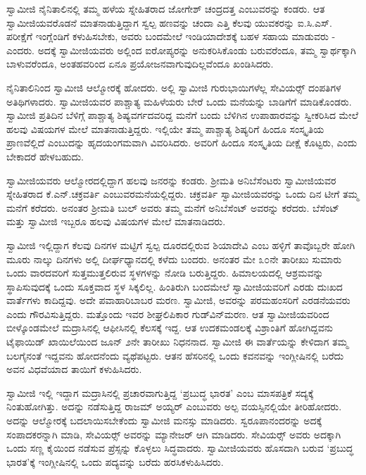 \vskip 2pt

 ಸ್ವಾಮೀಜಿ ನೈನಿತಾಲಿನಲ್ಲಿ ತಮ್ಮ ಹಳೆಯ ಸ್ನೇಹಿತರಾದ ಜೋಗೇಶ್ ಚಂದ್ರದತ್ತ ಎಂಬುವರನ್ನು ಕಂಡರು. ಆತ ಸ್ವಾಮೀಜಿಯವರೊಡನೆ ಮಾತನಾಡುತ್ತಿದ್ದಾಗ ಸ್ವಲ್ಪ ಹಣವನ್ನು ಚಂದಾ ಎತ್ತಿ ಕೆಲವು ಯುವಕರನ್ನು ಐ.ಸಿ.ಎಸ್. ಪರೀಕ್ಷೆಗೆ ಇಂಗ್ಲೆಂಡಿಗೆ ಕಳುಹಿಸಬೇಕು, ಅವರು ಬಂದಮೇಲೆ ಇಂಡಿಯಾದೇಶಕ್ಕೆ ಬಹಳ ಸಹಾಯ ಮಾಡುವರು - ಎಂದರು. ಅದಕ್ಕೆ ಸ್ವಾಮೀಜಿಯವರು ಅಲ್ಲಿಂದ ಐರೋಪ್ಯರನ್ನು ಅನುಕರಿಸಿಕೊಂಡು ಬರುವರೆಂದೂ, ತಮ್ಮ ಸ್ವಾರ್ಥಕ್ಕಾಗಿ ಬಾಳುವರೆಂದೂ, ಅಂತಹವರಿಂದ ಏನೂ ಪ್ರಯೋಜನವಾಗುವುದಿಲ್ಲವೆಂದೂ ಖಂಡಿಸಿದರು. 

 ನೈನಿತಾಲಿನಿಂದ ಸ್ವಾಮೀಜಿ ಆಲ್ಮೋರಕ್ಕೆ ಹೋದರು. ಅಲ್ಲಿ ಸ್ವಾಮೀಜಿ ಗುರುಭಾಯಿಗಳೆಲ್ಲ ಸೇವಿಯರ್ಸ್‍‍ ದಂಪತಿಗಳ ಅತಿಥಿಗಳಾದರು. ಸ್ವಾಮೀಜಿಯವರ ಪಾಶ್ಚಾತ್ಯ ಮಹಿಳೆಯರು ಬೇರೆ ಒಂದು ಮನೆಯನ್ನು ಬಾಡಿಗೆಗೆ ಮಾಡಿಕೊಂಡರು. ಸ್ವಾಮೀಜಿ ಪ್ರತಿದಿನ ಬೆಳಿಗ್ಗೆ ಪಾಶ್ಚಾತ್ಯ ಶಿಷ್ಯವರ್ಗದವರಿದ್ದ ಮನೆಗೆ ಬಂದು ಬೆಳಿಗಿನ ಉಪಾಹಾರವನ್ನು ಸ್ವೀಕರಿಸಿದ ಮೇಲೆ ಹಲವು ವಿಷಯಗಳ ಮೇಲೆ ಮಾತನಾಡುತ್ತಿದ್ದರು. ಇಲ್ಲಿಯೇ ತಮ್ಮ ಪಾಶ್ಚಾತ್ಯ ಶಿಷ್ಯರಿಗೆ ಹಿಂದೂ ಸಂಸ್ಕೃತಿಯ ಪ್ರಾಣವೆಲ್ಲಿದೆ ಎಂಬುದನ್ನು ಹೃದಯಂಗಮವಾಗಿ ವಿವರಿಸಿದರು. ಅವರಿಗೆ ಹಿಂದೂ ಸಂಸ್ಕೃತಿಯ ದೀಕ್ಷೆ ಕೊಟ್ಟರು, ಎಂದು ಬೇಕಾದರೆ ಹೇಳಬಹುದು. 

 ಸ್ವಾಮೀಜಿಯವರು ಆಲ್ಮೋರದಲ್ಲಿದ್ದಾಗ ಹಲವು ಜನರನ್ನು ಕಂಡರು. ಶ‍್ರೀಮತಿ ಅನಿಬೆಸೆಂಟರು ಸ್ವಾಮೀಜಿಯವರ ಸ್ನೇಹಿತರಾದ ಕೆ.ಎನ್.ಚಕ್ರವರ್ತಿ ಎಂಬುವರ\break ಮನೆಯಲ್ಲಿದ್ದರು. ಚಕ್ರವರ್ತಿ ಸ್ವಾಮೀಜಿಯವರನ್ನು ಒಂದು ದಿನ ಟೀಗೆ ತಮ್ಮ ಮನೆಗೆ ಕರೆದರು. ಅನಂತರ ಶ‍್ರೀಮತಿ ಬುಲ್ ಅವರು ತಮ್ಮ ಮನೆಗೆ ಅನಿಬೆಸೆಂಟ್ ಅವರನ್ನು ಕರೆದರು. ಬೆಸೆಂಟ್ ಮತ್ತು ಸ್ವಾಮೀಜಿ ಇಬ್ಬರೂ ಹಲವು ವಿಷಯಗಳ ಮೇಲೆ ಮಾತನಾಡಿದರು. 

 ಸ್ವಾಮೀಜಿ ಇಲ್ಲಿದ್ದಾಗ ಕೆಲವು ದಿನಗಳ ಮಟ್ಟಿಗೆ ಸ್ವಲ್ಪ ದೂರದಲ್ಲಿರುವ ಶಿಯಾದೇವಿ ಎಂಬ ಹಳ್ಳಿಗೆ ತಾವೊಬ್ಬರೇ ಹೋಗಿ ಮೂರು ನಾಲ್ಕು ದಿನಗಳು ಅಲ್ಲಿ ದೀರ್ಘಧ್ಯಾನದಲ್ಲಿ ಕಳೆದು ಬಂದರು. ಅನಂತರ ಮೇ ೩೦ನೇ ತಾರೀಖು ಸುಮಾರು ಒಂದು ವಾರದವರಿಗೆ ಸುತ್ತಮುತ್ತಲಿರುವ ಸ್ಥಳಗಳನ್ನು ನೋಡಿ ಬರುತ್ತಿದ್ದರು. ಹಿಮಾಲಯದಲ್ಲಿ ಆಶ್ರಮವನ್ನು ಸ್ಥಾಪಿಸುವುದಕ್ಕೆ ಒಂದು ಸೂಕ್ತವಾದ ಸ್ಥಳ ಸಿಕ್ಕಲಿಲ್ಲ. ಹಿಂತಿರುಗಿ ಬಂದಮೇಲೆ ಸ್ವಾಮೀಜಿಯವರಿಗೆ ಎರಡು ದುಃಖದ ವಾರ್ತೆಗಳು ಕಾದಿದ್ದವು. ಅದೇ ಪವಾಹಾರಿಬಾಬರ ಮರಣ. ಸ್ವಾಮೀಜಿ, ಅವರನ್ನು ಪರಮಹಂಸರಿಗೆ ಎರಡನೆಯವರು ಎಂದು ಗೌರವಿಸುತ್ತಿದ್ದರು. ಮತ್ತೊಂದು ಇವರ ಶೀಘ್ರಲಿಪಿಕಾರ ಗುಡ್‍ವಿನ್​ಮರಣ. ಆತ ಸ್ವಾಮೀಜಿಯವರಿಂದ ಬೀಳ್ಕೊಂಡಮೇಲೆ ಮದ್ರಾಸಿನಲ್ಲಿ  ಆಫೀಸಿನಲ್ಲಿ ಕೆಲಸಕ್ಕೆ ಇದ್ದ. ಆತ ಉದಕಮಂಡಲಕ್ಕೆ ವಿಶ್ರಾಂತಿಗೆ ಹೋಗಿದ್ದವನು ಟೈಫಾಯಿಡ್ ಖಾಯಿಲೆಯಿಂದ ಜೂನ್ ೨ನೇ ತಾರೀಖು ನಿಧನನಾದ. ಸ್ವಾಮೀಜಿ ಈ ವಾರ್ತೆಯನ್ನು ಕೇಳಿದಾಗ ತಮ್ಮ ಬಲಗೈನಂತೆ ಇದ್ದವನು ಹೋದನೆಂದು ವ್ಯಥೆಪಟ್ಟರು. ಆತನ ಹೆಸರಿನಲ್ಲಿ ಒಂದು ಕವನವನ್ನು ಇಂಗ್ಲೀಷಿನಲ್ಲಿ ಬರೆದು ಅವನ ವಿಧವೆಯಾದ ತಾಯಿಗೆ ಕಳುಹಿಸಿದರು. 

 ಸ್ವಾಮೀಜಿ ಇಲ್ಲಿ ಇದ್ದಾಗ ಮದ್ರಾಸಿನಲ್ಲಿ ಪ್ರಚಾರವಾಗುತ್ತಿದ್ದ ‘ಪ್ರಬುದ್ಧ ಭಾರತ’ ಎಂಬ ಮಾಸಪತ್ರಿಕೆ ಸದ್ಯಕ್ಕೆ ನಿಂತುಹೋಗಿತ್ತು. ಅದನ್ನು ನಡೆಸುತ್ತಿದ್ದ ರಾಜಮ್ ಅಯ್ಯರ್ ಎಂಬುವರು ಅಲ್ಪ ವಯಸ್ಸಿನಲ್ಲಿಯೇ ತೀರಿಹೋದರು. ಅದನ್ನು ಆಲ್ಮೋರಕ್ಕೆ ಬದಲಾಯಿಸಬೇಕೆಂದು ಸ್ವಾಮೀಜಿ ಮನಸ್ಸು ಮಾಡಿದರು. ಸ್ವರೂಪಾನಂದರನ್ನು ಅದಕ್ಕೆ ಸಂಪಾದಕರನ್ನಾಗಿ ಮಾಡಿ, ಸೇವಿಯರ್ಸ್‍‍ ಅವರನ್ನು ಮ್ಯಾನೇಜರ್ ಆಗಿ ಮಾಡಿದರು. ಸೇವಿಯರ್ಸ್‍‍ ಅವರು ಅದಕ್ಕಾಗಿ ಒಂದು ಸಣ್ಣ ಕೈಯಿಂದ ನಡೆಸುವ ಪ್ರೆಸ್ಸನ್ನು ಕೊಳ್ಳಲು ಸಿದ್ಧವಾದರು. ಸ್ವಾಮೀಜಿಯವರು ಹೊಸದಾಗಿ ಬರುವ ‘ಪ್ರಬುದ್ಧ ಭಾರತ’ಕ್ಕೆ ಇಂಗ್ಲೀಷಿನಲ್ಲಿ ಒಂದು ಪದ್ಯವನ್ನು ಬರೆದು ಹರಸಿಕಳುಹಿಸಿದರು. 

